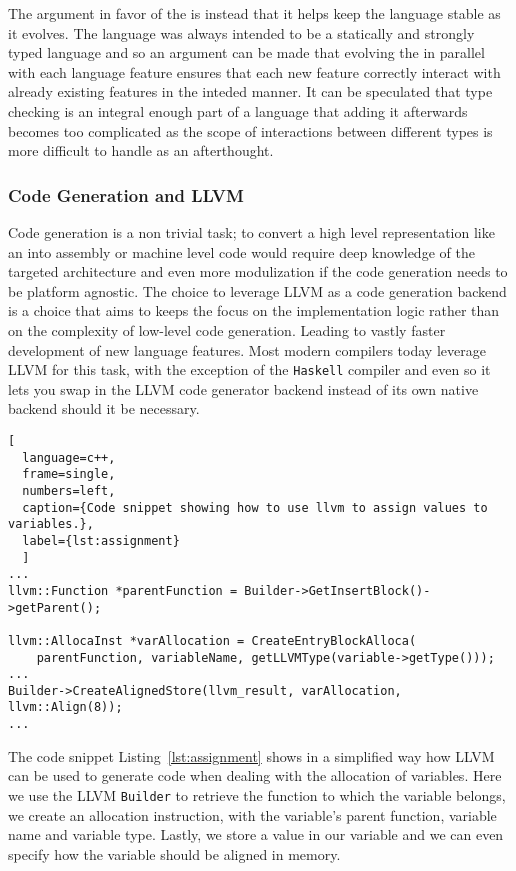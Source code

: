 The argument in favor of the \typeChecker{} is instead that it helps keep the
language stable as it evolves. The language was always intended to be a statically
and strongly typed language and so an argument can be made that evolving the
\typeChecker{} in parallel with each language feature ensures that each new feature
correctly interact with already existing features in the inteded manner. It can be
speculated that type checking is an integral enough part of a language that adding it
afterwards becomes too complicated as the scope of interactions between different
types is more difficult to handle as an afterthought. \\ 

\subsubsection{Code Generation and LLVM}

Code generation is a non trivial task; to convert a high level representation like an
\ast{} into assembly or machine level code would require deep knowledge of the targeted
architecture and even more modulization if the code generation needs to be platform
agnostic. The choice to leverage LLVM as a code generation backend is a choice that
aims to keeps the focus on the implementation logic rather than on
the complexity of low-level code generation. Leading to vastly faster development of
new language features. Most modern compilers today leverage LLVM for this task, with
the exception of the \texttt{Haskell} compiler and even so it lets you swap in the
LLVM code generator backend instead of its own native backend should it be necessary.

\begin{lstlisting}[
  language=c++,
  frame=single,
  numbers=left,
  caption={Code snippet showing how to use llvm to assign values to variables.},
  label={lst:assignment}
  ]
...
llvm::Function *parentFunction = Builder->GetInsertBlock()->getParent();

llvm::AllocaInst *varAllocation = CreateEntryBlockAlloca(
    parentFunction, variableName, getLLVMType(variable->getType()));
...
Builder->CreateAlignedStore(llvm_result, varAllocation, llvm::Align(8));
...
\end{lstlisting}

The code snippet Listing~\ref{lst:assignment} shows in a simplified way how LLVM can
be used to generate code when dealing with the allocation of variables.
Here we use the LLVM \texttt{Builder} to retrieve the function to which the variable
belongs, we create an allocation instruction, with the variable's parent function,
variable name and variable type. Lastly, we store a value in our variable and we can
even specify how the variable should be aligned in memory.\\

